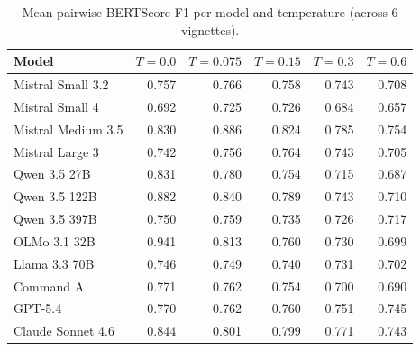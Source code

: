 \begin{table}[H]
  \centering\small
  \begin{tabular}{lrrrrr}
    \toprule
    Model & $T{=}0.0$ & $T{=}0.075$ & $T{=}0.15$ & $T{=}0.3$ & $T{=}0.6$ \\
    \midrule
    Mistral Small 3.2 & 0.757 & 0.766 & 0.758 & 0.743 & 0.708 \\
    Mistral Small 4 & 0.692 & 0.725 & 0.726 & 0.684 & 0.657 \\
    Mistral Medium 3.5 & 0.830 & 0.886 & 0.824 & 0.785 & 0.754 \\
    Mistral Large 3 & 0.742 & 0.756 & 0.764 & 0.743 & 0.705 \\
    Qwen 3.5 27B & 0.831 & 0.780 & 0.754 & 0.715 & 0.687 \\
    Qwen 3.5 122B & 0.882 & 0.840 & 0.789 & 0.743 & 0.710 \\
    Qwen 3.5 397B & 0.750 & 0.759 & 0.735 & 0.726 & 0.717 \\
    OLMo 3.1 32B & 0.941 & 0.813 & 0.760 & 0.730 & 0.699 \\
    Llama 3.3 70B & 0.746 & 0.749 & 0.740 & 0.731 & 0.702 \\
    Command A & 0.771 & 0.762 & 0.754 & 0.700 & 0.690 \\
    GPT-5.4 & 0.770 & 0.762 & 0.760 & 0.751 & 0.745 \\
    Claude Sonnet 4.6 & 0.844 & 0.801 & 0.799 & 0.771 & 0.743 \\
    \bottomrule
  \end{tabular}
  \caption{Mean pairwise BERTScore F1 per model and temperature (across 6 vignettes).}
\end{table}

